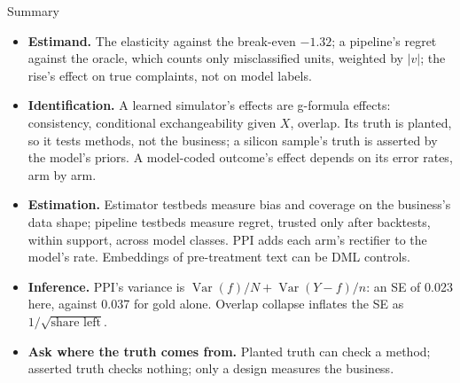 \documentclass[aspectratio=169, 11pt, handout]{beamer}
\newcommand{\Var}{\operatorname{Var}}
\newcommand{\spinestep}[1]{\textcolor{sbgreen}{\textbf{#1}}}
\begin{document}
\begin{frame}{Summary}

\begin{itemize}
  \item \spinestep{Estimand.} The elasticity against the break-even $-1.32$; a pipeline's regret against the oracle, which counts only misclassified units, weighted by $|v|$; the rise's effect on true complaints, not on model labels.
  \item \spinestep{Identification.} A learned simulator's effects are g-formula effects: consistency, conditional exchangeability given $X$, overlap. Its truth is planted, so it tests methods, not the business; a silicon sample's truth is asserted by the model's priors. A model-coded outcome's effect depends on its error rates, arm by arm.
  \item \spinestep{Estimation.} Estimator testbeds measure bias and coverage on the business's data shape; pipeline testbeds measure regret, trusted only after backtests, within support, across model classes. PPI adds each arm's rectifier to the model's rate. Embeddings of pre-treatment text can be DML controls.
  \item \spinestep{Inference.} PPI's variance is $\Var(f)/N + \Var(Y - f)/n$: an SE of 0.023 here, against 0.037 for gold alone. Overlap collapse inflates the SE as $1/\sqrt{\text{share left}}$.
  \item \textbf{Ask where the truth comes from.} Planted truth can check a method; asserted truth checks nothing; only a design measures the business.
\end{itemize}
\end{frame}
\end{document}
